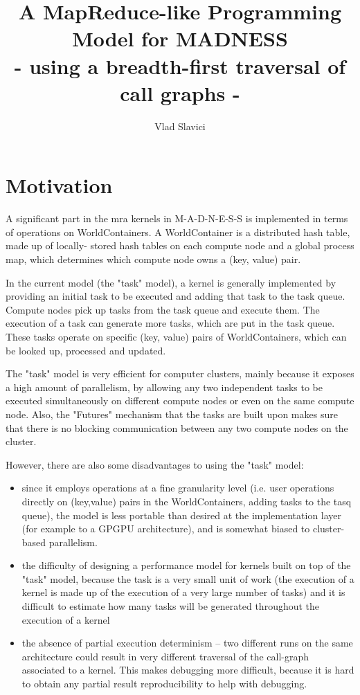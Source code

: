 \documentclass{article}
\title{A MapReduce-like Programming Model for MADNESS \\
       \small{- using a breadth-first traversal of call graphs -}}
\author{Vlad Slavici}
\date{}
\begin{document}
\maketitle

\section{Motivation}
\label{sec:Motivation}

A significant part in the mra kernels in M-A-D-N-E-S-S is implemented in terms
of operations on WorldContainers. A WorldContainer is a distributed hash table,
made up of locally- stored hash tables on each compute node and a global
process map, which determines which compute node owns a (key, value) pair.

In the current model (the "task" model), a kernel is generally implemented by
providing an initial task to be executed and adding that task to the task
queue. Compute nodes pick up tasks from the task queue and execute them. The
execution of a task can generate more tasks, which are put in the task queue.
These tasks operate on specific (key, value) pairs of WorldContainers, which
can be looked up, processed and updated.

The "task" model is very efficient for computer clusters, mainly because it
exposes a high amount of parallelism, by allowing any two independent tasks to
be executed simultaneously on different compute nodes or even on the same
compute node. Also, the "Futures" mechanism that the tasks are built upon makes
sure that there is no blocking communication between any two compute nodes on
the cluster.

However, there are also some disadvantages to using the "task" model:
\begin{itemize}

  \item since it employs operations at a fine granularity level (i.e. user
operations directly on (key,value) pairs in the WorldContainers, adding tasks
to the tasq queue), the model is less portable than desired at the
implementation layer (for example to a GPGPU architecture), and is somewhat
biased to cluster-based parallelism.

  \item the difficulty of designing a performance model for kernels built on
top of the "task" model, because the task is a very small unit of work (the
execution of a kernel is made up of the execution of a very large number of
tasks) and it is difficult to estimate how many tasks will be generated
throughout the execution of a kernel

  \item the absence of partial execution determinism -- two different runs on
the same architecture could result in very different traversal of the
call-graph associated to a kernel. This makes debugging more difficult,
because it is hard to obtain any partial result reproducibility to help with
debugging.

\end{itemize}
\end{document}
